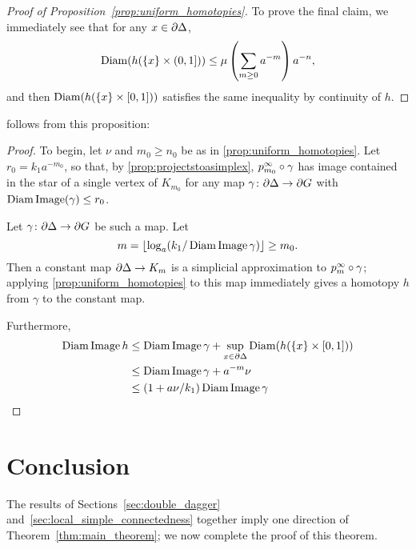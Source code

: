 \documentclass[a4paper]{article}
\begin{document}
\begin{proof}[Proof of Proposition~\ref{prop:uniform_homotopies}]
  To prove the final claim, we immediately see that for any $x \in
  \partial\Delta$,
  \begin{equation*}
    \operatorname{Diam}(h(\{x\}\times (0,1])) 
            \leq \mu \left(\sum_{m\geq 0} a^{-m}\right)a^{-n},
  \end{equation*}
  and then $\operatorname{Diam}(h(\{x\}\times [0,1]))$ satisfies the same inequality by
  continuity of $h$.
\end{proof}

 follows from this proposition:

\ddagimpliesLCtwo*

\begin{proof}
  To begin, let $\nu$ and $m_0 \geq n_0$ be as in
  \cref{prop:uniform_homotopies}. Let $r_0 =
  k_1a^{-m_0}$, so that, by \cref{prop:projectstoasimplex},
  $p^\infty_{m_0}\circ\gamma$ has image contained in the star of a single
  vertex of $K_{m_0}$ for any map $\gamma\colon\partial\Delta\to\partial
  G$ with $\operatorname{Diam}\operatorname{Image}(\gamma)\leq r_0$.

  Let $\gamma\colon\partial\Delta\to\partial G$ be such a map. Let 
  \begin{equation*}
    m = \lfloor\log_a(k_1/\operatorname{Diam}\operatorname{Image}\gamma)\rfloor \geq m_0.
  \end{equation*}
  Then a constant map $\partial\Delta \to K_m$ is a simplicial approximation
  to $p^\infty_m\circ\gamma$; applying \cref{prop:uniform_homotopies} to
  this map immediately gives a homotopy $h$ from $\gamma$ to the constant map.

  Furthermore,
  \begin{align*}
    \operatorname{Diam}\operatorname{Image} h &\leq \operatorname{Diam}\operatorname{Image}\gamma + \sup_{x \in\partial\Delta}
                                    \operatorname{Diam}(h(\{x\} \times [0,1])) \\
                  &\leq \operatorname{Diam}\operatorname{Image}\gamma + a^{-m} \nu \\
                  &\leq (1 + a\nu/k_1) \operatorname{Diam}\operatorname{Image}\gamma \qedhere
  \end{align*}
\end{proof}

\section{Conclusion}\label{sec:conclusion}

The results of Sections~\ref{sec:double_dagger}
and~\ref{sec:local_simple_connectedness} together imply one direction of
Theorem~\ref{thm:main_theorem}; we now complete the proof of this theorem.
\end{document}
